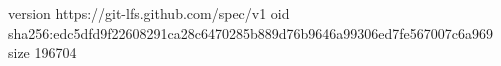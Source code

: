 version https://git-lfs.github.com/spec/v1
oid sha256:edc5dfd9f22608291ca28c6470285b889d76b9646a99306ed7fe567007c6a969
size 196704

